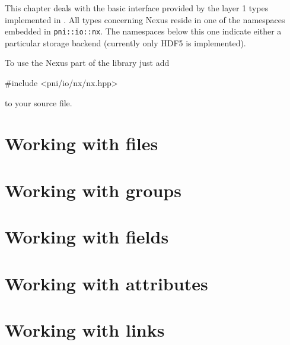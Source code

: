 
This chapter deals with the basic interface provided by the layer 1 types
implemented in \libpniio. All types concerning Nexus reside in one of the
namespaces embedded in {\tt pni::io::nx}. The namespaces below this one 
indicate either a particular storage backend (currently only HDF5 is
implemented).

To use the Nexus part of the library just add 
\begin{cppcode}
#include <pni/io/nx/nx.hpp>
\end{cppcode}
to your source file. 

\section{Working with files}



\section{Working with groups}



\section{Working with fields}



\section{Working with attributes}


\section{Working with links}




